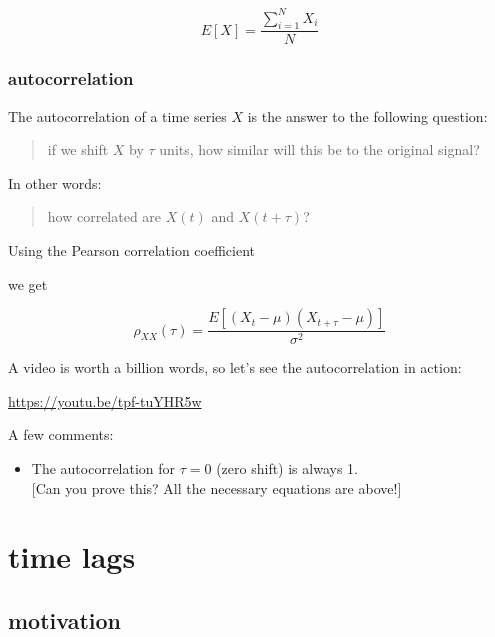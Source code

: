 \documentclass[
  letterpaper,
  DIV=11,
  numbers=noendperiod,
  oneside]{scrreprt}
\providecommand{\tightlist}{%
  \setlength{\itemsep}{0pt}\setlength{\parskip}{0pt}}\usepackage{longtable,booktabs,array}
\begin{document}
\[
E[X] = \frac{\displaystyle\sum_{i=1}^N X_i}{N}
\]

\hypertarget{autocorrelation-1}{%
\section{autocorrelation}\label{autocorrelation-1}}

The autocorrelation of a time series \(X\) is the answer to the
following question:

\begin{quote}
if we shift \(X\) by \(\tau\) units, how similar will this be to the
original signal?
\end{quote}

In other words:

\begin{quote}
how correlated are \(X(t)\) and \(X(t+\tau)\)?
\end{quote}

Using the Pearson correlation coefficient


we get

\[
\rho_{XX}(\tau) = \frac{E\left[ (X_t - \mu)(X_{t+\tau} - \mu) \right]}{\sigma^2}
\]

A video is worth a billion words, so let's see the autocorrelation in
action:

\url{https://youtu.be/tpf-tuYHR5w}

A few comments:

\begin{itemize}
\tightlist
\item
  The autocorrelation for \(\tau=0\) (zero shift) is always 1.\\
  {[}Can you prove this? All the necessary equations are above!{]}
\end{itemize}

\part{time lags}

\hypertarget{motivation-5}{%
\chapter{motivation}\label{motivation-5}}
\end{document}
